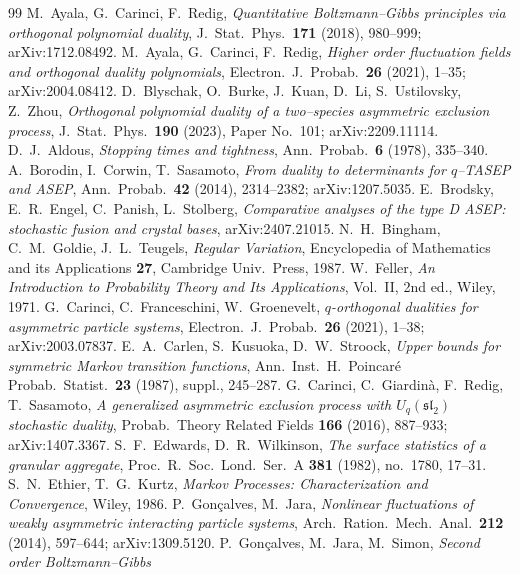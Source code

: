 \documentclass[11pt]{article}
\theoremstyle{plain}
\theoremstyle{definition}
\theoremstyle{remark}
\newcommand{\sutwo}{\mathfrak{sl}_2}\newcommand{\Lt}{\widetilde{\mathcal L}}
\begin{document}
\begin{thebibliography}{99}
 M.~Ayala, G.~Carinci, F.~Redig, \emph{Quantitative Boltzmann--Gibbs
principles via orthogonal polynomial duality}, J.~Stat.~Phys.~\textbf{171} (2018),
980--999; arXiv:1712.08492.
 M.~Ayala, G.~Carinci, F.~Redig, \emph{Higher order fluctuation fields and
orthogonal duality polynomials}, Electron.~J.~Probab.~\textbf{26} (2021), 1--35;
arXiv:2004.08412.
 D.~Blyschak, O.~Burke, J.~Kuan, D.~Li, S.~Ustilovsky, Z.~Zhou,
\emph{Orthogonal polynomial duality of a two--species asymmetric exclusion process},
J.~Stat.~Phys.~\textbf{190} (2023), Paper No.~101; arXiv:2209.11114.
 D.~J.~Aldous, \emph{Stopping times and tightness},
Ann.~Probab.~\textbf{6} (1978), 335--340.
 A.~Borodin, I.~Corwin, T.~Sasamoto, \emph{From duality to determinants for
$q$--TASEP and ASEP}, Ann.~Probab.~\textbf{42} (2014), 2314--2382; arXiv:1207.5035.
 E.~Brodsky, E.~R.~Engel, C.~Panish, L.~Stolberg, \emph{Comparative
analyses of the type D ASEP: stochastic fusion and crystal bases}, arXiv:2407.21015.
 N.~H.~Bingham, C.~M.~Goldie, J.~L.~Teugels, \emph{Regular Variation},
Encyclopedia of Mathematics and its Applications \textbf{27}, Cambridge Univ.\ Press,
1987.
 W.~Feller, \emph{An Introduction to Probability Theory and Its
Applications}, Vol.~II, 2nd ed., Wiley, 1971.
 G.~Carinci, C.~Franceschini, W.~Groenevelt, \emph{$q$-orthogonal
dualities for asymmetric particle systems}, Electron.~J.~Probab.~\textbf{26} (2021),
1--38; arXiv:2003.07837.
 E.~A.~Carlen, S.~Kusuoka, D.~W.~Stroock, \emph{Upper bounds for symmetric
Markov transition functions}, Ann.~Inst.~H.~Poincar\'e Probab.~Statist.~\textbf{23}
(1987), suppl., 245--287.
 G.~Carinci, C.~Giardin\`a, F.~Redig, T.~Sasamoto, \emph{A generalized
asymmetric exclusion process with $U_q(\sutwo)$ stochastic duality}, Probab.~Theory
Related Fields \textbf{166} (2016), 887--933; arXiv:1407.3367.
 S.~F.~Edwards, D.~R.~Wilkinson, \emph{The surface statistics of a granular
aggregate}, Proc.~R.~Soc.~Lond.~Ser.~A \textbf{381} (1982), no.~1780, 17--31.
 S.~N.~Ethier, T.~G.~Kurtz, \emph{Markov Processes: Characterization and
Convergence}, Wiley, 1986.
 P.~Gon\c{c}alves, M.~Jara, \emph{Nonlinear fluctuations of weakly asymmetric
interacting particle systems}, Arch.~Ration.~Mech.~Anal.~\textbf{212} (2014), 597--644;
arXiv:1309.5120.
 P.~Gon\c{c}alves, M.~Jara, M.~Simon, \emph{Second order Boltzmann--Gibbs
}
\end{thebibliography}
\end{document}
